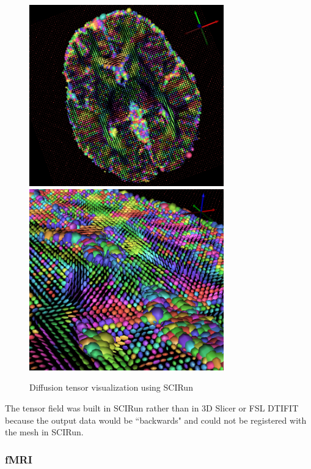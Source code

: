 \begin{figure}[p]
\begin{center}
\includegraphics[width=0.75\textwidth]{Figures/DTI_1.png}
\includegraphics[width=0.75\textwidth]{Figures/DTI_2.png}
\caption{Diffusion tensor visualization using SCIRun}
\label{fig:tensorvis}
\end{center}
\end{figure}

The tensor field was built in SCIRun rather than in 3D Slicer \cite{ref:slicer} or FSL DTIFIT because the output data would be ``backwards" and could not be registered with the mesh in SCIRun.

\newpage

\subsubsection{fMRI}
\label{sec:fmripre}

